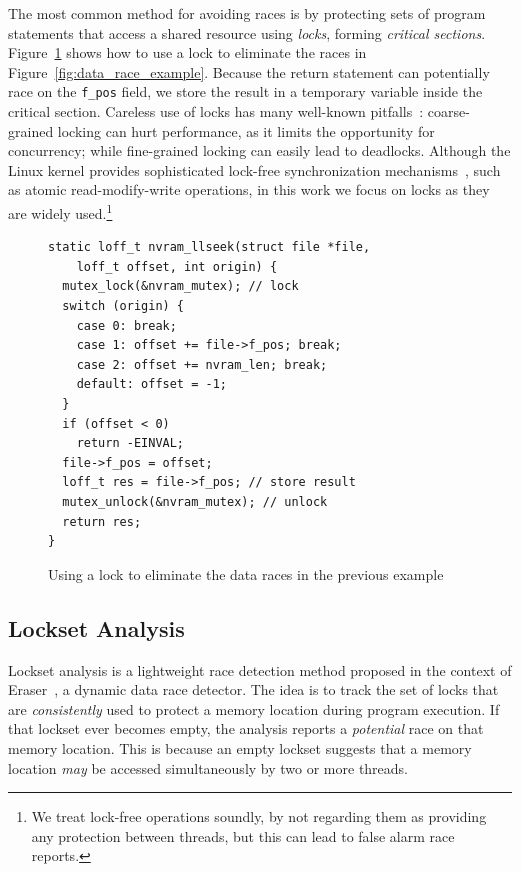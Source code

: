 The most common method for avoiding races is by protecting sets of program statements that access a shared resource using \emph{locks}, forming \emph{critical sections}.  Figure~\ref{fig:lock_example} shows how to use a lock to eliminate the races in Figure~\ref{fig:data_race_example}. Because the return statement can potentially race on the \texttt{f\_pos} field, we store the result in a temporary variable inside the critical section.
%
Careless use of locks has many well-known pitfalls~\cite{sutter2005software}: coarse-grained locking can hurt performance, as it limits the opportunity for concurrency; while fine-grained locking can easily lead to deadlocks. Although the Linux kernel provides sophisticated lock-free synchronization mechanisms~\cite{corbet2005linux}, such as atomic read-modify-write operations, in this work we focus on locks as they are widely used.\footnote{We treat lock-free operations soundly, by not regarding them as providing any protection between threads, but this can lead to false alarm race reports.}

\begin{figure}[t]
\begin{lstlisting}
static loff_t nvram_llseek(struct file *file,
    loff_t offset, int origin) {
  mutex_lock(&nvram_mutex); // lock
  switch (origin) {
    case 0: break;
    case 1: offset += file->f_pos; break;
    case 2: offset += nvram_len; break;
    default: offset = -1;
  }
  if (offset < 0)
    return -EINVAL;
  file->f_pos = offset;
  loff_t res = file->f_pos; // store result
  mutex_unlock(&nvram_mutex); // unlock
  return res;
}
\end{lstlisting}
\vspace{-2mm}
\caption{Using a lock to eliminate the data races in the previous example}
\label{fig:lock_example}
\end{figure}

\subsection{Lockset Analysis}
\label{bg:lockset}

Lockset analysis is a lightweight race detection method proposed in the context of Eraser~\cite{savage1997eraser}, a dynamic data race detector.  The idea is to track the set of locks that are \emph{consistently} used to protect a memory location during program execution. If that lockset ever becomes empty, the analysis reports a \emph{potential} race on that memory location. This is because an empty lockset suggests that a memory location \emph{may} be accessed simultaneously by two or more threads.  

